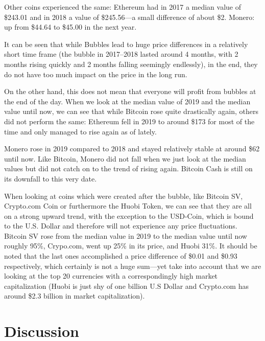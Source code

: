 \documentclass[11pt,a4paper,compsoc,conference]{IEEEtran}
\begin{document}
Other coins experienced the same: Ethereum had in 2017 a median value of \$243.01  and in 2018 a value of \$245.56---a small difference of about \$2. Monero: up from \$44.64  to \$45.00  in the next year. 

It can be seen that while Bubbles lead to huge price differences in a relatively short time frame (the bubble in 2017--2018 lasted around 4 months, with 2 months rising quickly and 2 months falling seemingly endlessly), in the end, they do not have too much impact on the price in the long run. 

On the other hand, this does not mean that everyone will profit from bubbles at the end of the day. When we look at the median value of 2019 and the median value until now, we can see that while Bitcoin rose quite drastically again, others did not perform the same: Ethereum fell in 2019 to around \$173 for most of the time and only managed to rise again as of lately. 


Monero rose in 2019 compared to 2018 and stayed relatively stable at around \$62  until now. Like Bitcoin, Monero did not fall when we just look at the median values but did not catch on to the trend of rising again. Bitcoin Cash is still on its downfall to this very date.

When looking at coins which were created after the bubble, like Bitcoin SV, Crypto.com Coin or furthermore the Huobi Token, we can see that they are all on a strong upward trend, with the exception to the USD-Coin, which is bound to the U.S. Dollar and therefore will not experience any price fluctuations. Bitcoin SV rose from the median value in 2019 to the median value until now roughly 95\%, Crypo.com, went up 25\% in its price, and Huobi 31\%. It should be noted that the last ones accomplished a price difference of \$0.01  and \$0.93  respectively, which certainly is not a huge sum---yet take into account that we are looking at the top 20 currencies with a correspondingly high market capitalization (Huobi is just shy of one billion U.S Dollar and Crypto.com has around \$2.3 billion  in market capitalization).  



\section{Discussion}
\end{document}
